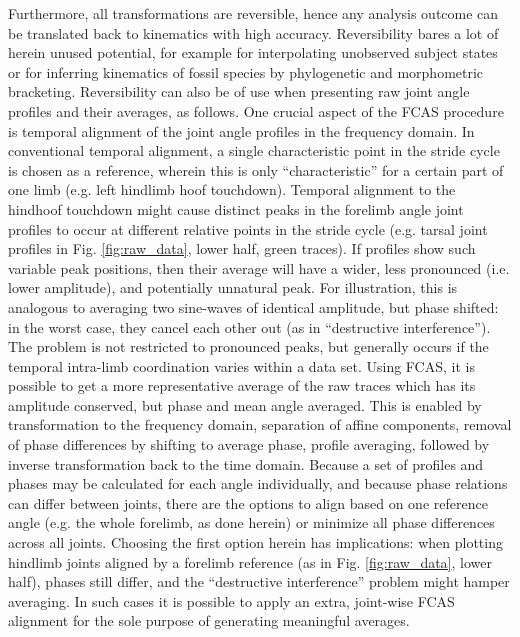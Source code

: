 Furthermore, all transformations are reversible, hence any analysis outcome can be translated back to kinematics with high accuracy.
Reversibility bares a lot of herein unused potential, for example for interpolating unobserved subject states or for inferring kinematics of fossil species by phylogenetic and morphometric bracketing.
Reversibility can also be of use when presenting raw joint angle profiles and their averages, as follows.
One crucial aspect of the FCAS procedure is temporal alignment of the joint angle profiles in the frequency domain.
In conventional temporal alignment, a single characteristic point in the stride cycle is chosen as a reference, wherein this is only ``characteristic'' for a certain part of one limb (e.g. left hindlimb hoof touchdown).
Temporal alignment to the hindhoof touchdown might cause distinct peaks in the forelimb angle joint profiles to occur at different relative points in the stride cycle (e.g. tarsal joint profiles in Fig. \ref{fig:raw_data}, lower half, green traces).
If profiles show such variable peak positions, then their average will have a wider, less pronounced (i.e. lower amplitude), and potentially unnatural peak.
For illustration, this is analogous to averaging two sine-waves of identical amplitude, but phase shifted: in the worst case, they cancel each other out (as in ``destructive interference'').
The problem is not restricted to pronounced peaks, but generally occurs if the temporal intra-limb coordination varies within a data set.
Using FCAS, it is possible to get a more representative average of the raw traces which has its amplitude conserved, but phase and mean  angle averaged.
This is enabled by transformation to the frequency domain, separation of affine components, removal of phase differences by shifting to average phase, profile averaging, followed by inverse transformation back to the time domain.
Because a set of profiles and phases may be calculated for each  angle individually, and because phase relations can differ between joints, there are the options to align based on one reference angle (e.g. the whole forelimb, as done herein) or minimize all phase differences across all joints.
Choosing the first option herein has implications: when plotting hindlimb joints aligned by a forelimb reference (as in Fig. \ref{fig:raw_data}, lower half), phases still differ, and the ``destructive interference'' problem might hamper averaging.
In such cases it is possible to apply an extra, joint-wise FCAS alignment for the sole purpose of generating meaningful averages.



